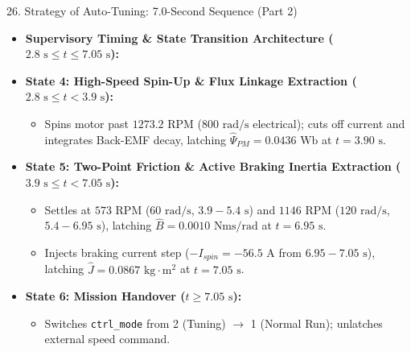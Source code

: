 \documentclass[aspectratio=169]{beamer}
\begin{document}
\begin{frame}{26. Strategy of Auto-Tuning: 7.0-Second Sequence (Part 2)}
    \begin{itemize}
        \item \textbf{Supervisory Timing \& State Transition Architecture ($2.8\text{ s} \le t \le 7.05\text{ s}$):}
        \item \textbf{State 4: High-Speed Spin-Up \& Flux Linkage Extraction ($2.8\text{ s} \le t < 3.9\text{ s}$):}
        \begin{itemize}
            \item Spins motor past $1273.2\text{ RPM}$ ($800\text{ rad/s}$ electrical); cuts off current and integrates Back-EMF decay, latching $\hat{\Psi}_{PM} = 0.0436\text{ Wb}$ at $t = 3.90\text{ s}$.
        \end{itemize}
        \item \textbf{State 5: Two-Point Friction \& Active Braking Inertia Extraction ($3.9\text{ s} \le t < 7.05\text{ s}$):}
        \begin{itemize}
            \item Settles at $573\text{ RPM}$ ($60\text{ rad/s}$, $3.9 - 5.4\text{ s}$) and $1146\text{ RPM}$ ($120\text{ rad/s}$, $5.4 - 6.95\text{ s}$), latching $\hat{B} = 0.0010\text{ Nms/rad}$ at $t = 6.95\text{ s}$.
            \item Injects braking current step ($-I_{spin} = -56.5\text{ A}$ from $6.95 - 7.05\text{ s}$), latching $\hat{J} = 0.0867\text{ kg}\cdot\text{m}^2$ at $t = 7.05\text{ s}$.
        \end{itemize}
        \item \textbf{State 6: Mission Handover ($t \ge 7.05\text{ s}$):}
        \begin{itemize}
            \item Switches \texttt{ctrl\_mode} from 2 (Tuning) $\rightarrow$ 1 (Normal Run); unlatches external speed command.
        \end{itemize}
    \end{itemize}
\end{frame}
\end{document}
